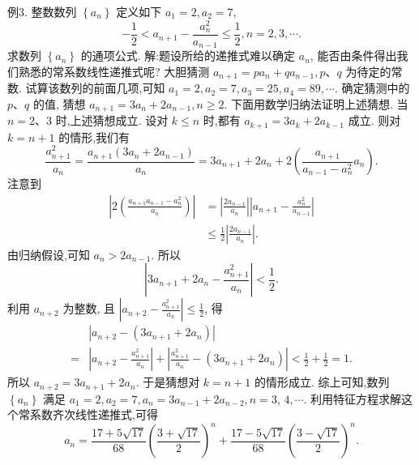 例3. 整数数列 $\left\{a_n\right\}$ 定义如下 $a_1=2, a_2=7$,
$$
-\frac{1}{2}<a_{n+1}-\frac{a_n^2}{a_{n-1}} \leqslant \frac{1}{2}, n=2,3, \cdots .
$$
求数列 $\left\{a_n\right\}$ 的通项公式.
解:题设所给的递推式难以确定 $a_n$, 能否由条件得出我们熟悉的常系数线性递推式呢? 大胆猜测 $a_{n+1}=p a_n+q a_{n-1}, p 、 q$ 为待定的常数.
试算该数列的前面几项,可知 $a_1=2, a_2=7, a_3=25, a_4=89, \cdots$. 确定猜测中的 $p 、 q$ 的值, 猜想 $a_{n+1}=3 a_n+2 a_{n-1}, n \geqslant 2$.
下面用数学归纳法证明上述猜想.
当 $n=2 、 3$ 时,上述猜想成立.
设对 $k \leqslant n$ 时,都有 $a_{k+1}=3 a_k+2 a_{k-1}$ 成立.
则对 $k=n+1$ 的情形,我们有
$$
\frac{a_{n+1}^2}{a_n}=\frac{a_{n+1}\left(3 a_n+2 a_{n-1}\right)}{a_n}=3 a_{n+1}+2 a_n+2\left(\frac{a_{n+1}}{a_{n-1}-a_n^2} a_n\right) .
$$
注意到
$$
\begin{aligned}
\left|2\left(\frac{a_{n+1} a_{n-1}-a_n^2}{a_n}\right)\right| & =\left|\frac{2 a_{n-1}}{a_n}\right|\left|a_{n+1}-\frac{a_n^2}{a_{n-1}}\right| \\
& \leqslant \frac{1}{2}\left|\frac{2 a_{n-1}}{a_n}\right| .
\end{aligned}
$$
由归纳假设,可知 $a_n>2 a_{n-1}$. 所以
$$
\left|3 a_{n+1}+2 a_n-\frac{a_{n+1}^2}{a_n}\right|<\frac{1}{2} .
$$
利用 $a_{n+2}$ 为整数, 且 $\left|a_{n+2}-\frac{a_{n+1}^2}{a_n}\right| \leqslant \frac{1}{2}$, 得
$$
\begin{aligned}
& \left|a_{n+2}-\left(3 a_{n+1}+2 a_n\right)\right| \\
= & \left|a_{n+2}-\frac{a_{n+1}^2}{a_n}\right|+\left|\frac{a_{n+1}^2}{a_n}-\left(3 a_{n+1}+2 a_n\right)\right|<\frac{1}{2}+\frac{1}{2}=1 .
\end{aligned}
$$
所以 $a_{n+2}=3 a_{n+1}+2 a_n$. 于是猜想对 $k=n+1$ 的情形成立.
综上可知,数列 $\left\{a_n\right\}$ 满足 $a_1=2, a_2=7, a_n=3 a_{n-1}+2 a_{n-2}, n=3$, $4, \cdots$. 利用特征方程求解这个常系数齐次线性递推式,可得
$$
a_n=\frac{17+5 \sqrt{17}}{68}\left(\frac{3+\sqrt{17}}{2}\right)^n+\frac{17-5 \sqrt{17}}{68}\left(\frac{3-\sqrt{17}}{2}\right)^n .
$$



